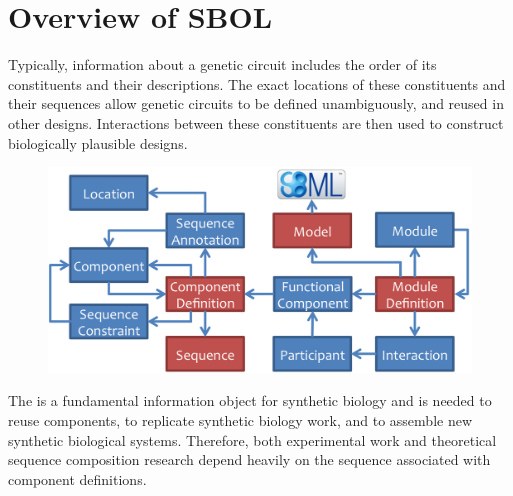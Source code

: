 \section{Overview of SBOL}
Typically, information about a  genetic circuit includes the order of its constituents and their descriptions. The exact locations of these constituents and their sequences allow genetic circuits to be defined unambiguously, and reused in other designs. Interactions between these constituents are then used to construct biologically plausible designs. 


\begin{figure}[ht]
\begin{center}
\includegraphics[scale=1.2]{images/SBOL2_2_revised.png}
\caption[]{ }
\label{images:overview}
\end{center}
\end{figure}

The  is a fundamental information object for synthetic biology and is needed to reuse components, to replicate synthetic biology work, and to assemble new synthetic biological systems. 
Therefore, both experimental work and theoretical sequence composition research depend heavily on the sequence associated with component definitions.

